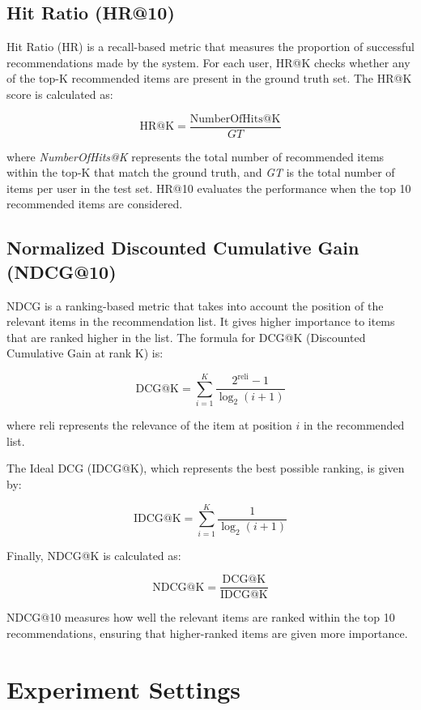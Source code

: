 \documentclass{article}
\begin{document}
\subsection{Hit Ratio (HR@10)}
Hit Ratio (HR) is a recall-based metric that measures the proportion of successful recommendations made by the system. For each user, HR@K checks whether any of the top-K recommended items are present in the ground truth set. The HR@K score is calculated as:

\[
\text{HR@K} = \frac{\text{NumberOfHits@K}}{GT}
\]

where \textit{NumberOfHits@K} represents the total number of recommended items within the top-K that match the ground truth, and \textit{GT} is the total number of items per user in the test set. HR@10 evaluates the performance when the top 10 recommended items are considered.

\subsection{Normalized Discounted Cumulative Gain (NDCG@10)}
NDCG is a ranking-based metric that takes into account the position of the relevant items in the recommendation list. It gives higher importance to items that are ranked higher in the list. The formula for DCG@K (Discounted Cumulative Gain at rank K) is:

\[
\text{DCG@K} = \sum_{i=1}^{K} \frac{2^{\text{reli}} - 1}{\log_2(i + 1)}
\]

where \( \text{reli} \) represents the relevance of the item at position \( i \) in the recommended list. 

The Ideal DCG (IDCG@K), which represents the best possible ranking, is given by:

\[
\text{IDCG@K} = \sum_{i=1}^{K} \frac{1}{\log_2(i + 1)}
\]

Finally, NDCG@K is calculated as:

\[
\text{NDCG@K} = \frac{\text{DCG@K}}{\text{IDCG@K}}
\]

NDCG@10 measures how well the relevant items are ranked within the top 10 recommendations, ensuring that higher-ranked items are given more importance.

\newpage

\section{Experiment Settings}
\end{document}
